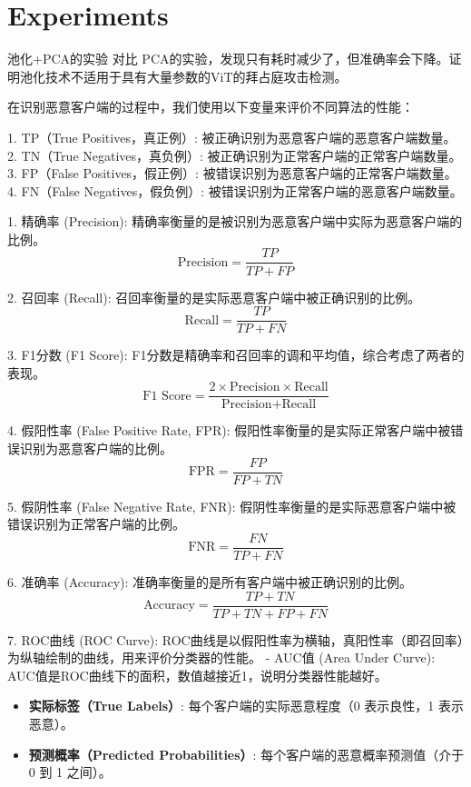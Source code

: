 \documentclass[conference]{IEEEtran}
\begin{document}
\section{Experiments}
\label{sec:exp}

池化+PCA的实验 对比 PCA的实验，发现只有耗时减少了，但准确率会下降。证明池化技术不适用于具有大量参数的ViT的拜占庭攻击检测。

在识别恶意客户端的过程中，我们使用以下变量来评价不同算法的性能：

1. TP（True Positives，真正例）: 被正确识别为恶意客户端的恶意客户端数量。
2. TN（True Negatives，真负例）: 被正确识别为正常客户端的正常客户端数量。
3. FP（False Positives，假正例）: 被错误识别为恶意客户端的正常客户端数量。
4. FN（False Negatives，假负例）: 被错误识别为正常客户端的恶意客户端数量。

1. 精确率 (Precision): 精确率衡量的是被识别为恶意客户端中实际为恶意客户端的比例。
    \[
    \text{Precision} = \frac{TP}{TP + FP}
    \]

2. 召回率 (Recall): 召回率衡量的是实际恶意客户端中被正确识别的比例。
    \[
    \text{Recall} = \frac{TP}{TP + FN}
    \]

3. F1分数 (F1 Score): F1分数是精确率和召回率的调和平均值，综合考虑了两者的表现。
    \[
    \text{F1 Score} = \frac{2 \times \text{Precision} \times \text{Recall}}{\text{Precision} + \text{Recall}}
    \]

4. 假阳性率 (False Positive Rate, FPR): 假阳性率衡量的是实际正常客户端中被错误识别为恶意客户端的比例。
    \[
    \text{FPR} = \frac{FP}{FP + TN}
    \]

5. 假阴性率 (False Negative Rate, FNR): 假阴性率衡量的是实际恶意客户端中被错误识别为正常客户端的比例。
    \[
    \text{FNR} = \frac{FN}{TP + FN}
    \]

6. 准确率 (Accuracy): 准确率衡量的是所有客户端中被正确识别的比例。
    \[
    \text{Accuracy} = \frac{TP + TN}{TP + TN + FP + FN}
    \]

7. ROC曲线 (ROC Curve): ROC曲线是以假阳性率为横轴，真阳性率（即召回率）为纵轴绘制的曲线，用来评价分类器的性能。
    - AUC值 (Area Under Curve): AUC值是ROC曲线下的面积，数值越接近1，说明分类器性能越好。

\begin{itemize}
    \item \textbf{实际标签（True Labels）}: 每个客户端的实际恶意程度（0 表示良性，1 表示恶意）。
    \item \textbf{预测概率（Predicted Probabilities）}: 每个客户端的恶意概率预测值（介于 0 到 1 之间）。
\end{itemize}
\end{document}
